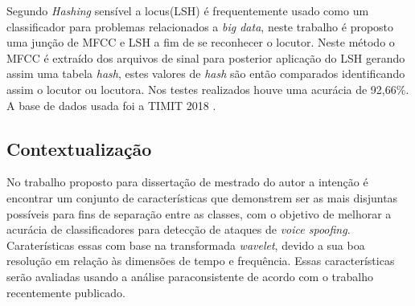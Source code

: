 \documentclass[a4paper,12pt,openright,oneside]{book}
\newenvironment{myenv}[1]
  {\begin{spacing}{#1}}
  {\end{spacing}}
\begin{document}
\begin{myenv}{1.5}
			\par Segundo \cite{8396208} \textit{Hashing} sensível a locus(LSH) é frequentemente usado como um classificador para problemas relacionados a \textit{big data}, neste trabalho é proposto uma junção de MFCC e LSH a fim de se reconhecer o locutor. Neste método o MFCC é extraído dos arquivos de sinal para posterior aplicação do LSH gerando assim uma tabela \textit{hash}, estes valores de \textit{hash} são então comparados identificando assim o locutor ou locutora. Nos testes realizados houve uma acurácia de 92,66\%. A base de dados usada foi a TIMIT 2018 \cite{TIMIT2018}. 

			\subsection{Contextualização}
			\par No trabalho proposto para dissertação de mestrado do autor a intenção é encontrar um conjunto de características que demonstrem ser as mais disjuntas possíveis para fins de separação entre as classes, com o objetivo de melhorar a acurácia de classificadores para detecção de ataques de \textit{voice spoofing}. Caraterísticas essas com base na transformada \textit{wavelet}, devido a sua boa resolução em relação às dimensões de tempo e frequência. Essas características serão avaliadas usando a análise paraconsistente de acordo com o trabalho \cite{8588433} recentemente publicado.

		\end{myenv}
\end{document}
